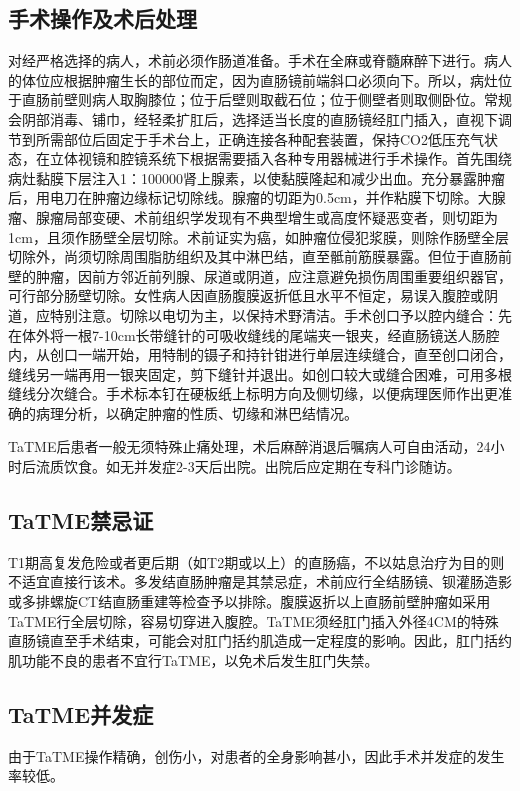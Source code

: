 \documentclass[a4paper,11pt,onecolumn,twoside]{article}
\begin{document}
\begin{multicols}{2}
    \subsection{手术操作及术后处理}
    对经严格选择的病人，术前必须作肠道准备。手术在全麻或脊髓麻醉下进行。病人的体位应根据肿瘤生长的部位而定，因为直肠镜前端斜口必须向下。所以，病灶位于直肠前壁则病人取胸膝位；位于后壁则取截石位；位于侧壁者则取侧卧位。常规会阴部消毒、铺巾，经轻柔扩肛后，选择适当长度的直肠镜经肛门插入，直视下调节到所需部位后固定于手术台上，正确连接各种配套装置，保持CO2低压充气状态，在立体视镜和腔镜系统下根据需要插入各种专用器械进行手术操作。首先围绕病灶黏膜下层注入1：100000肾上腺素，以使黏膜隆起和减少出血。充分暴露肿瘤后，用电刀在肿瘤边缘标记切除线。腺瘤的切距为0.5cm，并作粘膜下切除。大腺瘤、腺瘤局部变硬、术前组织学发现有不典型增生或高度怀疑恶变者，则切距为1cm，且须作肠壁全层切除。术前证实为癌，如肿瘤位侵犯浆膜，则除作肠壁全层切除外，尚须切除周围脂肪组织及其中淋巴结，直至骶前筋膜暴露。但位于直肠前壁的肿瘤，因前方邻近前列腺、尿道或阴道，应注意避免损伤周围重要组织器官，可行部分肠壁切除。女性病人因直肠腹膜返折低且水平不恒定，易误入腹腔或阴道，应特别注意。切除以电切为主，以保持术野清洁。手术创口予以腔内缝合：先在体外将一根7-10cm长带缝针的可吸收缝线的尾端夹一银夹，经直肠镜送人肠腔内，从创口一端开始，用特制的镊子和持针钳进行单层连续缝合，直至创口闭合，缝线另一端再用一银夹固定，剪下缝针并退出。如创口较大或缝合困难，可用多根缝线分次缝合。手术标本钉在硬板纸上标明方向及侧切缘，以便病理医师作出更准确的病理分析，以确定肿瘤的性质、切缘和淋巴结情况\supercite{12}。

    TaTME后患者一般无须特殊止痛处理，术后麻醉消退后嘱病人可自由活动，24小时后流质饮食。如无并发症2-3天后出院。出院后应定期在专科门诊随访。

    \subsection{TaTME禁忌证}
    T1期高复发危险或者更后期（如T2期或以上）的直肠癌，不以姑息治疗为目的则不适宜直接行该术。多发结直肠肿瘤是其禁忌症，术前应行全结肠镜、钡灌肠造影或多排螺旋CT结直肠重建等检查予以排除。腹膜返折以上直肠前壁肿瘤如采用TaTME行全层切除，容易切穿进入腹腔。TaTME须经肛门插入外径4CM的特殊直肠镜直至手术结束，可能会对肛门括约肌造成一定程度的影响。因此，肛门括约肌功能不良的患者不宜行TaTME，以免术后发生肛门失禁\supercite{13}。

    \subsection{TaTME并发症}
    由于TaTME操作精确，创伤小，对患者的全身影响甚小，因此手术并发症的发生率较低。


\end{multicols}
\end{document}
